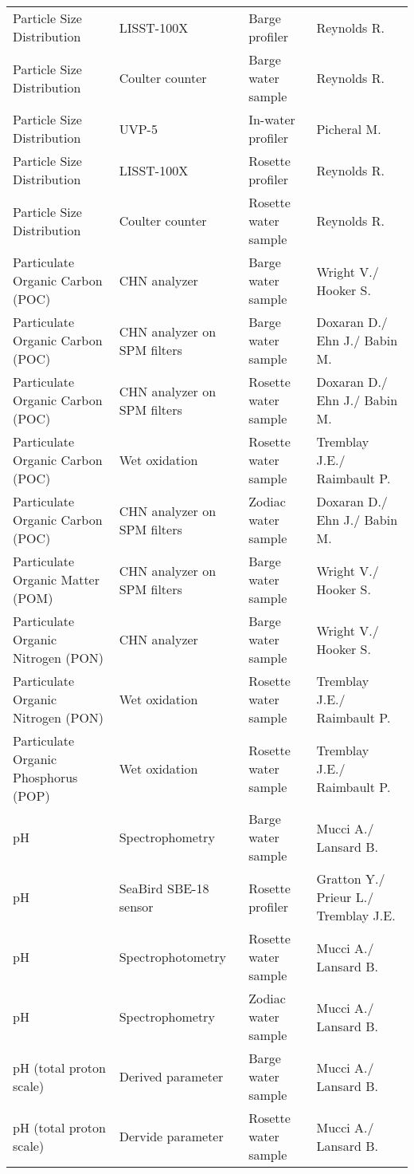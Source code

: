 \begin{longtable}[t]{llll}
Particle Size Distribution & LISST-100X & Barge profiler & Reynolds R.\\
Particle Size Distribution & Coulter counter & Barge water sample & Reynolds R.\\
Particle Size Distribution & UVP-5 & In-water profiler & Picheral M.\\
Particle Size Distribution & LISST-100X & Rosette profiler & Reynolds R.\\
Particle Size Distribution & Coulter counter & Rosette water sample & Reynolds R.\\
\addlinespace
Particulate Organic Carbon (POC) & CHN analyzer & Barge water sample & Wright V./ Hooker S.\\
Particulate Organic Carbon (POC) & CHN analyzer on SPM filters & Barge water sample & Doxaran D./ Ehn J./ Babin M.\\
Particulate Organic Carbon (POC) & CHN analyzer on SPM filters & Rosette water sample & Doxaran D./ Ehn J./ Babin M.\\
Particulate Organic Carbon (POC) & Wet oxidation & Rosette water sample & Tremblay J.E./ Raimbault P.\\
Particulate Organic Carbon (POC) & CHN analyzer on SPM filters & Zodiac water sample & Doxaran D./ Ehn J./ Babin M.\\
\addlinespace
Particulate Organic Matter (POM) & CHN analyzer on SPM filters & Barge water sample & Wright V./ Hooker S.\\
Particulate Organic Nitrogen (PON) & CHN analyzer & Barge water sample & Wright V./ Hooker S.\\
Particulate Organic Nitrogen (PON) & Wet oxidation & Rosette water sample & Tremblay J.E./ Raimbault P.\\
Particulate Organic Phosphorus (POP) & Wet oxidation & Rosette water sample & Tremblay J.E./ Raimbault P.\\
pH & Spectrophometry & Barge water sample & Mucci A./ Lansard B.\\
\addlinespace
pH & SeaBird SBE-18 sensor & Rosette profiler & Gratton Y./ Prieur L./ Tremblay J.E.\\
pH & Spectrophotometry & Rosette water sample & Mucci A./ Lansard B.\\
pH & Spectrophometry & Zodiac water sample & Mucci A./ Lansard B.\\
pH (total proton scale) & Derived parameter & Barge water sample & Mucci A./ Lansard B.\\
pH (total proton scale) & Dervide parameter & Rosette water sample & Mucci A./ Lansard B.\\

\end{longtable}
